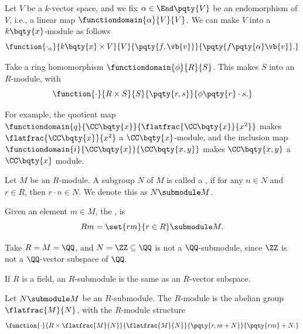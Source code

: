 \begin{example*}
    Let \(V\) be a \(k\)-vector space, and we fix \(\alpha \in \End\pqty{V}\) be an endomorphism of \(V\), i.e., a linear map \(\functiondomain{\alpha}{V}{V}\). We can make \(V\) into a \(k\bqty{x}\)-module as follows
    \[
        \function{\cdot_{\alpha}}{k\bqty{x} \times V}{V}{\pqty{f, \vb{v}}}{\pqty{f\pqty{\alpha} \vb{v}}.}
    \]
\end{example*}

\begin{example*}
    Take a ring homomorphism \(\functiondomain{\phi}{R}{S}\). This makes \(S\) into an \(R\)-module, with
    \[
        \function{\cdot}{R \times S}{S}{\pqty{r, s}}{\phi\pqty{r} \cdot s.}
    \]

    For example, the quotient map \(\functiondomain{q}{\CC\bqty{x}}{\flatfrac{\CC\bqty{x}}{x^2}}\) makes \(\flatfrac{\CC\bqty{x}}{x^2}\) a \(\CC\bqty{x}\)-module, and the inclusion map \(\functiondomain{i}{\CC\bqty{x}}{\CC\bqty{x, y}}\) makes \(\CC\bqty{x, y}\) a \(\CC\bqty{x}\) module.
\end{example*}

\begin{definition}[Submodule]
    \label{def:submodule}%
    Let \(M\) be an \(R\)-module. A subgroup \(N\) of \(M\) is called a , if for any \(n \in N\) and \(r \in R\), then \(r \cdot n \in N\). We denote this as \(N \submodule M\).

    Given an element \(m \in M\), the , is
    \[
        Rm = \set{rm}{r \in R} \submodule M.
    \]
\end{definition}

\begin{example*}
    Take \(R = M = \QQ\), and \(N = \ZZ \subseteq \QQ\) is not a \(\QQ\)-submodule, since \(\ZZ\) is not a \(\QQ\)-vector subspace of \(\QQ\).
\end{example*}

\begin{remark}
    If \(R\) is a field, an \(R\)-submodule is the same as an \(R\)-vector subspace.
\end{remark}

\begin{definition}
    \label{def:quotient-submodule}%
    Let \(N \submodule M\) be an \(R\)-submodule. The  \(R\)-module is the abelian group \(\flatfrac{M}{N}\), with the \(R\)-module structure
    \[
        \function{\cdot}{R \times \flatfrac{M}{N}}{\flatfrac{M}{N}}{\pqty{r, m + N}}{\pqty{rm} + N.}
    \] 
\end{definition}

